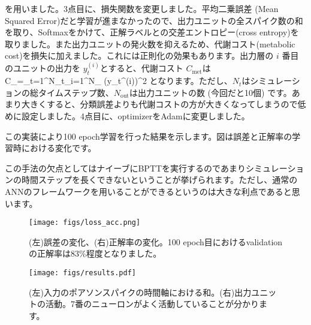 を用いました。3点目に、損失関数を変更しました。平均二乗誤差 (Mean Squared Error)だと学習が進まなかったので、出力ユニットの全スパイク数の和を取り、Softmaxをかけて、正解ラベルとの交差エントロピー(cross entropy)を取りました。また出力ユニットの発火数を抑えるため、代謝コスト(metabolic cost)を損失に加えました。これには正則化の効果もあります。出力層の $i$ 番目のユニットの出力を $y_t^{(i)}$とすると、代謝コスト $C_{\text{met}}$は 
C_{}=\sum_{t=1}^{N_t}\sum_{i=1}^{N_{}} \left(y_t^{(i)}\right)^2 
となります。ただし、$N_t$はシミュレーションの総タイムステップ数、$N_{\text{out}}$は出力ユニットの数 (今回だと10個) です。あまり大きくすると、分類誤差よりも代謝コストの方が大きくなってしまうので低めに設定しました。4点目に、optimizerをAdamに変更しました。\par
この実装により100 epoch学習を行った結果を示します。図は誤差と正解率の学習時における変化です。\par
この手法の欠点としてはナイーブにBPTTを実行するのであまりシミュレーションの時間ステップを長くできないということが挙げられます。ただし、通常のANNのフレームワークを用いることができるというのは大きな利点であると思います。
\begin{figure}[htbp]
    \centering
    \texttt{[image: figs/loss\_acc.png]}
    \caption{(左)誤差の変化、(右)正解率の変化。100 epoch目におけるvalidationの正解率は83\%程度となりました。}
    \label{fig:snu_1}
\end{figure}
\begin{figure}[htbp]
    \centering
    \texttt{[image: figs/results.pdf]}
    \caption{(左)入力のポアソンスパイクの時間軸における和。(右)出力ユニットの活動。7番のニューロンがよく活動していることが分かります。}
    \label{fig:snu_2}
\end{figure}
